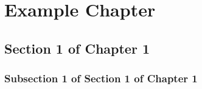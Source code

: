 

\chapter{Example Chapter}
\label{chapter:example}

\section{Section 1 of Chapter 1}
\label{section:example}

\subsection{Subsection 1 of Section 1 of Chapter 1}
\label{subsection:example}
